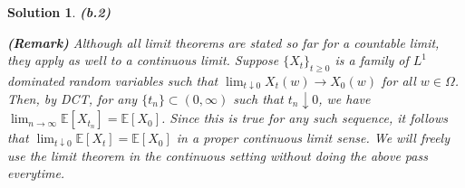 \documentclass{article} %
\theoremstyle{quest}
\newtheorem*{solution}{Solution}
\begin{document}
\begin{solution}
\bigskip

\textbf{(b.2)} 

\textbf{(Remark)} Although all limit theorems are stated so far
for a countable limit, they apply as well to a continuous limit. 
Suppose $\{X_t\}_{t \geq 0}$ is a family of $L^1$ dominated 
random variables such that $\lim_{t \downarrow 0}
X_t(w) \to X_0(w)$ for all $w \in \Omega$. Then, by DCT, for any $\{t_n\} \subset
(0,\infty)$ such that $t_n \downarrow 0$, 
we have $\lim_{n \to \infty} \mathbb{E}[X_{t_n}] = 
\mathbb{E}[X_0]$. Since this is true for any such sequence, it follows that
$\lim_{t \downarrow 0}\mathbb{E}[X_t] = \mathbb{E}[X_0]$ in a proper continuous limit
sense. We will freely use the limit theorem in the continuous setting without
doing the above pass everytime.


\end{solution}

\newpage
\end{document}

